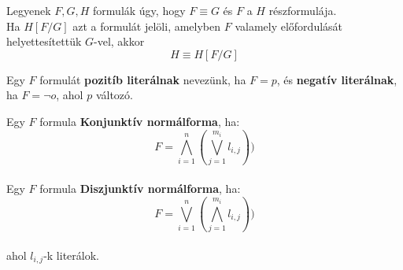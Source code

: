 \begin{frame}

\begin{tcolorbox}[title={Lemma: Helyettesítési Lemma}]
Legyenek $F, G, H$ formulák úgy, hogy $F \equiv G$ és $F$ a $H$ részformulája.\\
Ha $H[F/G]$ azt a formulát jelöli, amelyben $F$ valamely előfordulását helyettesítettük $G$-vel, akkor
$$H \equiv H[F/G]$$
\end{tcolorbox}

\end{frame}

\begin{frame}

\begin{tcolorbox}[title={Def.: Literál}]
Egy $F$ formulát \textbf{pozitíb literálnak} nevezünk, ha $F = p$, és \textbf{negatív literálnak}, ha $F = {\neg}o$, ahol $p$ változó.
\end{tcolorbox}

\begin{tcolorbox}[title={Def.: Konjunktív, diszjunktív normálforma}]
Egy $F$ formula \textbf{Konjunktív normálforma}, ha:\\
$$F = \bigwedge_{i = 1}^n (\bigvee_{j = 1}^{m_i} l_{i, j}))$$\\
Egy $F$ formula \textbf{Diszjunktív normálforma}, ha:\\
$$F = \bigvee_{i = 1}^n (\bigwedge_{j = 1}^{m_i} l_{i, j}))$$\\
ahol $l_{i, j}$-k literálok.
\end{tcolorbox}

\end{frame}

